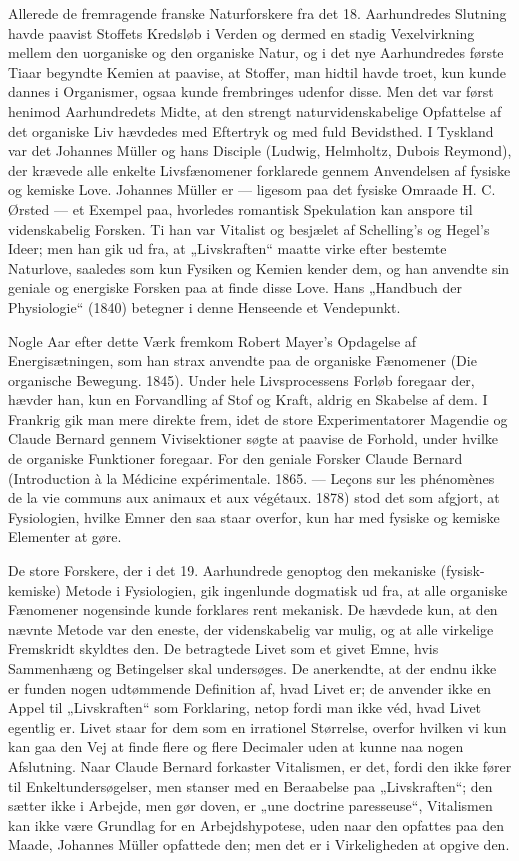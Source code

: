 \documentclass[12pt,a4paper,openany]{book}
\newcommand{\opage}[1]{\marginnote{\footnotesize\textit{[#1]}}}
\begin{document}
Allerede de fremragende franske Naturforskere fra det 18. Aarhundredes
Slutning havde paavist Stoffets Kredsløb i Verden og
dermed en stadig Vexelvirkning mellem den uorganiske og den organiske
Natur, og i det nye Aarhundredes første Tiaar begyndte Kemien
at paavise, at Stoffer, man hidtil havde troet, kun kunde dannes
i Organismer, ogsaa kunde frembringes udenfor disse. Men det
var først henimod Aarhundredets Midte, at den strengt naturvidenskabelige
Opfattelse af det organiske Liv hævdedes med Eftertryk
og med fuld Bevidsthed. I Tyskland var det Johannes Müller og
hans Disciple (Ludwig, Helmholtz, Dubois Reymond), der krævede
alle enkelte Livsfænomener forklarede gennem Anvendelsen af
fysiske og kemiske Love. Johannes Müller er --- ligesom paa det
fysiske Omraade H. C. Ørsted --- et Exempel paa, hvorledes romantisk
Spekulation kan anspore til videnskabelig Forsken. Ti han var Vitalist
og besjælet af Schelling’s og Hegel’s Ideer; men han gik ud fra,
at „Livskraften“ maatte virke efter bestemte Naturlove, saaledes
som kun Fysiken og Kemien kender dem, og han anvendte sin geniale
og energiske Forsken paa at finde disse Love. Hans „Handbuch
der Physiologie“ (1840) betegner i denne Henseende et Vendepunkt.


Nogle Aar efter dette Værk fremkom Robert Mayer’s Opdagelse
af Energisætningen, som han strax anvendte paa de organiske Fænomener
(Die organische Bewegung. 1845). Under hele Livsprocessens
Forløb foregaar der, hævder han, kun en Forvandling af Stof
og Kraft, aldrig en Skabelse af dem.
I Frankrig gik man mere direkte frem, idet de store Experimentatorer
Magendie og Claude Bernard gennem Vivisektioner søgte at
paavise de Forhold, under hvilke de organiske Funktioner foregaar.
For den geniale Forsker Claude Bernard (Introduction à la Médicine
\opage{34}expérimentale. 1865. --- Leçons sur les phénomènes de la vie communs
aux animaux et aux végétaux. 1878) stod det som afgjort, at
Fysiologien, hvilke Emner den saa staar overfor, kun har med fysiske
og kemiske Elementer at gøre.

De store Forskere, der i det 19. Aarhundrede genoptog den mekaniske
(fysisk-kemiske) Metode i Fysiologien, gik ingenlunde dogmatisk
ud fra, at alle organiske Fænomener nogensinde kunde forklares
rent mekanisk. De hævdede kun, at den nævnte Metode var den
eneste, der videnskabelig var mulig, og at alle virkelige Fremskridt
skyldtes den. De betragtede Livet som et givet Emne, hvis Sammenhæng
og Betingelser skal undersøges. De anerkendte, at der
endnu ikke er funden nogen udtømmende Definition af, hvad Livet
er; de anvender ikke en Appel til „Livskraften“ som Forklaring,
netop fordi man ikke véd, hvad Livet egentlig er. Livet staar for
dem som en irrationel Størrelse, overfor hvilken vi kun kan gaa
den Vej at finde flere og flere Decimaler uden at kunne naa nogen
Afslutning. Naar Claude Bernard forkaster Vitalismen, er det, fordi
den ikke fører til Enkeltundersøgelser, men stanser med en Beraabelse
paa „Livskraften“; den sætter ikke i Arbejde, men gør doven,
er „une doctrine paresseuse“, Vitalismen kan ikke være Grundlag for
en Arbejdshypotese, uden naar den opfattes paa den Maade, Johannes
Müller opfattede den; men det er i Virkeligheden at opgive den.
\end{document}
